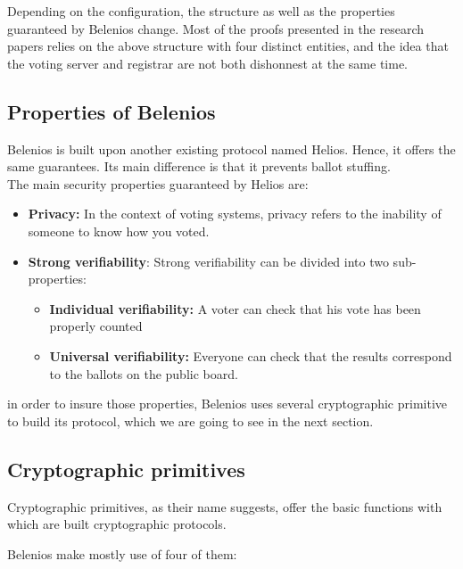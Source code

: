 \documentclass[12pt, a4paper]{report}
\begin{document}
Depending on the configuration, the structure as well as the properties guaranteed by Belenios change. Most of the proofs presented in the research papers relies on the above structure with four distinct entities, and the idea that the voting server and registrar are not both dishonnest at the same time.


\subsection{Properties of Belenios}

Belenios is built upon another existing protocol named Helios. Hence, it offers the same guarantees. Its main difference is that it prevents ballot stuffing.\\

The main security properties guaranteed by Helios are:

\begin{itemize}

\item \textbf{Privacy:} In the context of voting systems, privacy refers to the inability of someone to know how you voted.

\item \textbf{Strong verifiability}: Strong verifiability can be divided into two sub-properties:
\begin{itemize}
	\item \textbf{Individual verifiability:} A voter can check that his vote has been properly 													  counted
	\item \textbf{Universal verifiability:} Everyone can check that the results correspond to the 												 ballots on the public board.
\end{itemize}

\end{itemize}

in order to insure those properties, Belenios uses several cryptographic primitive to build its protocol, which we are going to see in the next section. 


\subsection{Cryptographic primitives}

Cryptographic primitives, as their name suggests, offer the basic functions with which are built cryptographic protocols.

Belenios make mostly use of four of them:
\end{document}
